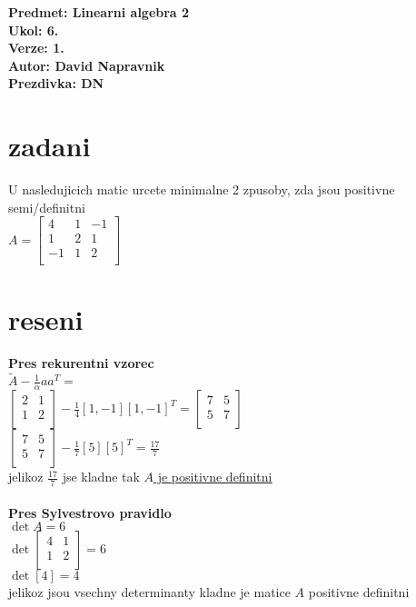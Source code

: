 \documentclass[a4paper]{article}
\def\doubleunderline#1{\underline{\underline{#1}}}
\begin{document}
\noindent
\textbf{Predmet: Linearni algebra 2}\\
\textbf{Ukol: 6.}\\
\textbf{Verze: 1.}\\
\textbf{Autor: David Napravnik}\\
\textbf{Prezdivka: DN}

\section*{zadani}
U nasledujicich matic urcete minimalne 2 zpusoby, zda jsou positivne
semi/definitni\\
$A=
\begin{bmatrix}
	 4 & 1 & -1\\
	 1 & 2 &  1\\
	-1 & 1 &  2\\
\end{bmatrix}
$

\section*{reseni}
\textbf{Pres rekurentni vzorec}\\
$\tilde{A}-\frac{1}{\alpha}aa^T=$\\
$
\begin{bmatrix}
	2 &  1\\
	1 &  2\\
\end{bmatrix}
-\frac{1}{4}[1,-1][1,-1]^T
=
\begin{bmatrix}
	7 &  5\\
	5 &  7\\
\end{bmatrix}
$\\
$
\begin{bmatrix}
	7 &  5\\
	5 &  7\\
\end{bmatrix}
-\frac{1}{7}[5][5]^T
=
\frac{17}{7}
$\\
jelikoz $\frac{17}{7}$ jse kladne tak \doubleunderline{$A$ je positivne definitni}\\
\\
\textbf{Pres Sylvestrovo pravidlo}\\
$\det A = 6$\\
$\det 
\begin{bmatrix}
	4 &  1\\
	1 &  2\\
\end{bmatrix}
= 6$\\
$\det [4] = 4$\\
jelikoz jsou vsechny determinanty kladne je matice $A$ positivne definitni\\
\end{document}
